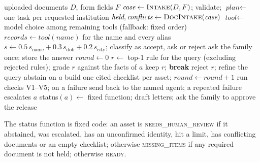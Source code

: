 \begin{algorithm}[H]
\caption{Core loop of Waris (limits: $R_{\max}=6$, $Q_{\max}=2$, $T_{\max}=8$, $L_{\max}=40$).}\label{alg:core}
\footnotesize{}
\begin{algorithmic}[1]
\Require uploaded documents $D$, form fields $F$
\State $\textit{case} \gets \textsc{Intake}(D, F)$; validate; $\textit{plan} \gets$ one task per requested institution
\State $\textit{held}, \textit{conflicts} \gets \textsc{DocIntake}(\textit{case})$
  \State $\textit{tool} \gets$ model choice among remaining tools (fallback: fixed order)
  \State $\textit{records} \gets \textit{tool}(\textit{name})$ for the name and every alias
  \; $s \gets 0.5\,s_{\text{name}}+0.3\,s_{\text{dob}}+0.2\,s_{\text{city}}$; classify as accept, ask or reject \EndFor
\EndFor
{} \State ask the family once; store the answer \EndWhile
\State $\textit{round} \gets 0$
\Repeat
      \State $r \gets$ top-1 rule for the query (excluding rejected rules); grade $r$ against the facts of $a$
       \State keep $r$; \textbf{break} \Else \State reject $r$; refine the query \EndIf
    \EndFor
     \State abstain on $a$ \EndIf
  \EndFor
  \State build one cited checklist per asset; $\textit{round} \gets \textit{round}+1$
  \State run checks V1--V5; on a failure send back to the named agent; a repeated failure escalates $a$
\State status$(a) \gets$ fixed function; draft letters; ask the family to approve the release
\end{algorithmic}
\end{algorithm}

The status function is fixed code: an asset is \textsc{needs\_human\_review} if it abstained, was escalated, has an unconfirmed identity, hit a limit, has conflicting documents or an empty checklist; otherwise \textsc{missing\_items} if any required document is not held; otherwise \textsc{ready}.

